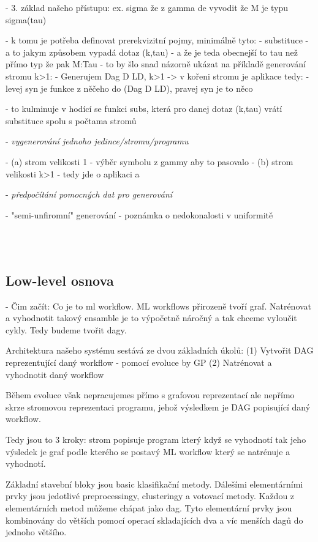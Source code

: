 \documentclass[a4paper,oneside]{memoir}
\begin{document}
- 3. základ našeho přístupu: ex. sigma že z gamma de vyvodit že M je typu sigma(tau)

  - k tomu je potřeba definovat prerekvizitní pojmy, minimálně tyto:
    - substituce
    - a to jakym způsobem vypadá dotaz (k,tau) - a že je teda obecnejší to tau než přímo typ že pak M:Tau
      - to by šlo snad názorně ukázat na příkladě generování stromu k>1:
      - Generujem Dag D LD, k>1 -> v kořeni stromu je aplikace tedy:
         - levej syn je funkce z něčeho do (Dag D LD), pravej syn je to něco

  - to kulminuje v hodící se funkci subs, která pro danej dotaz (k,tau) vrátí substituce spolu s počtama stromů


- \textit{vygenerování jednoho jedince/stromu/programu}

 - (a) strom velikosti 1 - výběr symbolu z gammy aby to pasovalo
 - (b) strom velikosti k>1 - tedy jde o aplikaci a

- \textit{předpočítání pomocných dat pro generování}


- "semi-unfiromní" generování - poznámka o nedokonalosti v uniformitě

~\\

~\\

\subsection{Low-level osnova}

- Čim začít: 
Co je to ml workflow. 
ML workflows přirozeně tvoří graf. 
Natrénovat a vyhodnotit takový ensamble je to výpočetně náročný a tak chceme vyloučit cykly. 
Tedy budeme tvořit dagy. 

Architektura našeho systému sestává ze dvou základních úkolů:
(1) Vytvořit DAG reprezentující daný workflow - pomocí evoluce by GP
(2) Natrénovat a vyhodnotit daný workflow

Během evoluce však nepracujemes přímo s grafovou reprezentací ale nepřímo skrze stromovou reprezentaci programu, jehož výsledkem je DAG popisující daný workflow.

Tedy jsou to 3 kroky: strom popisuje program který když se vyhodnotí tak jeho výsledek je graf podle kterého se postavý ML workflow který se natrénuje a vyhodnotí.


Základní stavební bloky jsou basic klasifikační metody.
Dálešími elementárními prvky jsou jedotlivé preprocessingy, clusteringy a votovací metody. 
Každou z elementárních metod můžeme chápat jako dag.
Tyto elementární prvky jsou kombinovány do větších pomocí operací skladajících dva a víc menších dagů do jednoho většího.
\end{document}
